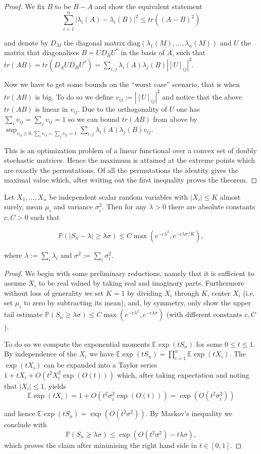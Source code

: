 \begin{proof}
	We fix $B$ to be $B-A$ and show the equivalent statement $$\sum_{i=1}^n |\lambda_i(A)-\lambda_i(B)|^2\leq tr\left((A-B)^2\right)$$
	
	and denote by $D_M$ the diagonal matrix $\text{diag}(\lambda_1(M),\dots,\lambda_n(M))$ and $U$ the matrix that diagonalises $B=UD_BU^*$ in the basis of $A$, such that $tr(AB)=tr(D_A U D_B U^*)=\sum_{i,j}\lambda_i(A)\lambda_j(B)|[U]_{ij}|^2.$
	
	Now we have to get some bounds on the ``worst case'' scenario, that is when $tr(AB)$ is big. To do so we define $v_{ij}:=|[U]_{ij}|^2$ and notice that the above $tr(AB)$ is linear in $v_{ij}$. Due to the orthogonality of $U$ one has $\sum_i v_{ij}=\sum_j v_{ij}=1$ so we can bound $tr(AB)$ from above by $\sup_{v_{ij}\geq 0,\sum_i v_{ij}=\sum_j v_{ij}=1}\sum_{i,j}\lambda_i(A)\lambda_j(B)v_{ij}.$
	
	This is an optimization problem of a linear functional over a convex set of doubly stochastic matrices. Hence the maximum is attained at the extreme points which are exactly the permutations. Of all the permutations the identity gives the maximal value which, after writing out the first inequality proves the theorem.
\end{proof}

\begin{theorem}
	Let $X_1,\dots,X_n$ be independent scalar random variables with $|X_i|\leq K$ almost surely, mean $\mu_i$ and variance $\sigma_i^2$. Then for any $\lambda>0$ there are absolute constants $c,C>0$ such that 
	
	$$\mathbb P(|S_n-\lambda|\geq\lambda\sigma)\leq C\max(e^{-c\lambda^2}, e^{-c\lambda\sigma/K}),$$
	
	where $\lambda:=\sum_i \lambda_i$ and $\sigma^2:=\sum_i \sigma_i^2$.
\end{theorem}
\begin{proof}
	We begin with some preliminary reductions, namely that it is sufficient to assume $X_i$ to be real valued by taking real and imaginary parts. Furthermore without loss of generality we set $K=1$ by dividing $X_i$ through $K$, center $X_i$ (i.e. set $\mu_i$ to zero by subtracting its mean), and, by symmetry, only show the upper tail estimate $\mathbb P(S_n\geq\lambda\sigma)\leq C\max(e^{-c\lambda^2}, e^{-c\lambda\sigma})$ (with different constants $c,C$).
	
	To do so we compute the exponential moments $\mathbb E \exp(tS_n)$ for some $0\leq t\leq 1$. By independence of the $X_i$ we have $\mathbb E \exp(tS_n)=\prod_{i=1}^n \mathbb E \exp(tX_i)$. The $\exp(tX_i)$ can be expanded into a Taylor series $1+tX_i+O(t^2X_i^2\exp(O(t)))$ which, after taking expectation and noting that $|X_i|\leq 1$, yields
	$$\mathbb E\exp(tX_i)=1+O(t^2\sigma_i^2\exp(O(t)))=\exp(O(t^2\sigma_i^2))$$
	
	and hence $\mathbb E\exp(tS_n)=\exp(O(t^2\sigma^2))$. By Markov's inequality we conclude with $$\mathbb P(S_n\geq\lambda\sigma)\leq\exp(O(t^2\sigma^2)-t\lambda\sigma),$$ which proves the claim after minimising the right hand side in $t\in[0,1]$.
\end{proof}

